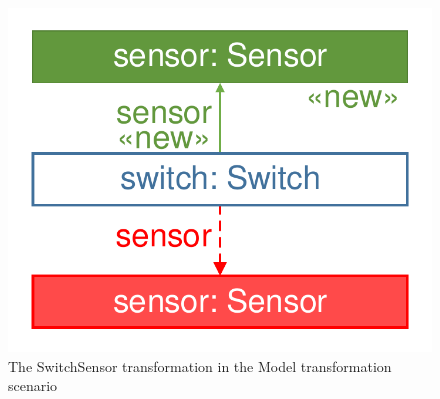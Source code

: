 \begin{figure}[!Htb]
	\centering
	\includegraphics[scale=0.4]{figures/trainbenchmark-transformation-xform-switchsensor}
	\caption{The \textsf{SwitchSensor} transformation in the Model transformation scenario}
	\label{fig:trainbenchmark-transformation-xform-switchsensor}
\end{figure}


